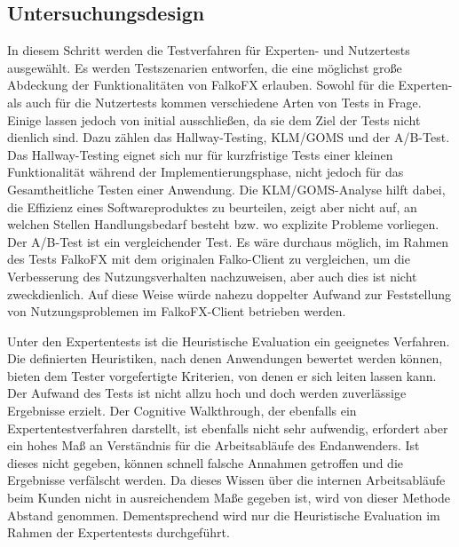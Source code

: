 \subsection{Untersuchungsdesign}
In diesem Schritt werden die Testverfahren für Experten- und Nutzertests ausgewählt. Es werden Testszenarien entworfen, die eine möglichst große Abdeckung der Funktionalitäten von FalkoFX erlauben.
Sowohl für die Experten- als auch für die Nutzertests kommen verschiedene Arten von Tests in Frage. Einige lassen jedoch von initial ausschließen, da sie dem Ziel der Tests nicht dienlich sind. Dazu zählen das Hallway-Testing, KLM/GOMS und der A/B-Test. Das Hallway-Testing eignet sich nur für kurzfristige Tests einer kleinen Funktionalität während der Implementierungsphase, nicht jedoch für das Gesamtheitliche Testen einer Anwendung. Die KLM/GOMS-Analyse hilft dabei, die Effizienz eines Softwareproduktes zu beurteilen, zeigt aber nicht auf, an welchen Stellen Handlungsbedarf besteht bzw. wo explizite Probleme vorliegen. Der A/B-Test ist ein vergleichender Test. Es wäre durchaus möglich, im Rahmen des Tests FalkoFX mit dem originalen Falko-Client zu vergleichen, um die Verbesserung des Nutzungsverhalten nachzuweisen, aber auch dies ist nicht zweckdienlich. Auf diese Weise würde nahezu doppelter Aufwand zur Feststellung von Nutzungsproblemen im FalkoFX-Client betrieben werden.\par
Unter den Expertentests ist die Heuristische Evaluation ein geeignetes Verfahren. Die definierten Heuristiken, nach denen Anwendungen bewertet werden können, bieten dem Tester vorgefertigte Kriterien, von denen er sich leiten lassen kann. Der Aufwand des Tests ist nicht allzu hoch und doch werden zuverlässige Ergebnisse erzielt. Der Cognitive Walkthrough, der ebenfalls ein Expertentestverfahren darstellt, ist ebenfalls nicht sehr aufwendig, erfordert aber ein hohes Maß an Verständnis für die Arbeitsabläufe des Endanwenders. Ist dieses nicht gegeben, können schnell falsche Annahmen getroffen und die Ergebnisse verfälscht werden. Da dieses Wissen über die internen Arbeitsabläufe beim Kunden nicht in ausreichendem Maße gegeben ist, wird von dieser Methode Abstand genommen. Dementsprechend wird nur die Heuristische Evaluation im Rahmen der Expertentests durchgeführt.\par
